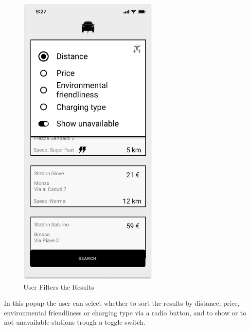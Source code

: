\begin{figure}[H]
    \centering
    \includegraphics[keepaspectratio, height=15cm]{Mockup/UserAppInterface/Filter Menu.png}
    \caption{User Filters the Results}
    \label{fig:Filters}
\end{figure}
In this popup the user can select whether to sort the results by distance, price, environmental friendliness or charging type via a radio button, and to show or to not unavailable stations trough a toggle switch.
